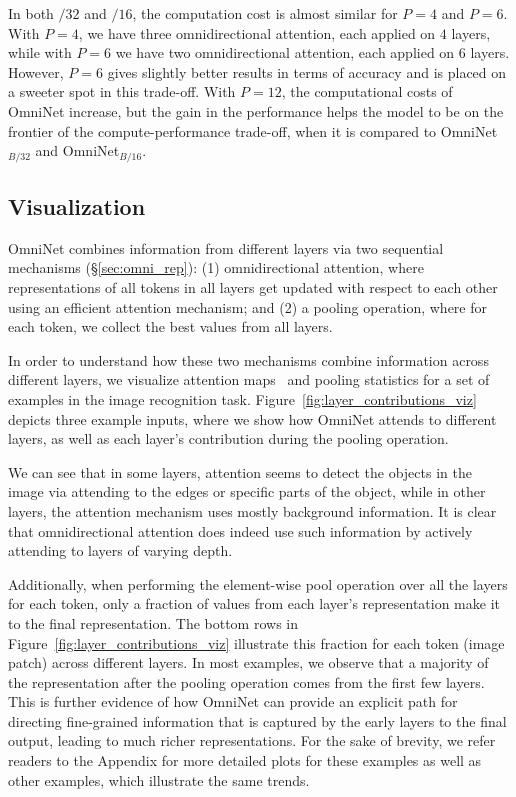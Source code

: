 \documentclass{article}
\begin{document}
In both $/32$ and $/16$, the computation cost is almost similar for $P=4$ and $P=6$. With $P=4$, we have three omnidirectional attention, each applied on $4$ layers, while with $P=6$ we have two omnidirectional attention, each applied on $6$ layers. However, $P=6$ gives slightly better results in terms of accuracy and is placed on a sweeter spot in this trade-off. 
With $P=12$, the computational costs of OmniNet increase, but the gain in the performance helps the model to be on the frontier of the compute-performance trade-off, when it is compared to  OmniNet$_{B/32}$ and OmniNet$_{B/16}$.

\subsection{Visualization}


OmniNet combines information from different layers via two sequential mechanisms (\S\ref{sec:omni_rep}): (1) omnidirectional attention, where representations of all tokens in all layers get updated with respect to each other using an efficient attention mechanism; and (2) a pooling operation, where for each token, we collect the best values from all layers. 

In order to understand how these two mechanisms combine information across different layers, we visualize attention maps~\citep{abnar-zuidema-2020-quantifying} and pooling statistics for a set of examples in the image recognition task. 
Figure~\ref{fig:layer_contributions_viz} depicts three example inputs, where we show how OmniNet attends to different layers, as well as each layer's contribution during the pooling operation.

We can see that in some layers, attention seems to detect the objects in the image via attending to the edges or specific parts of the object, while in other layers, the attention mechanism uses mostly background information. It is clear that omnidirectional attention does indeed use such information by actively attending to layers of varying depth.

Additionally, when performing the element-wise pool operation over all the layers for each token, only a fraction of values from each layer's representation make it to the final representation. The bottom rows in Figure~\ref{fig:layer_contributions_viz} illustrate this fraction for each token (image patch) across different layers. In most examples, we observe that a majority of the representation after the pooling operation comes from the first few layers. This is further evidence of how OmniNet can provide an explicit path for directing fine-grained information that is captured by the early layers to the final output, leading to much richer representations.
For the sake of brevity, we refer readers to the Appendix for more detailed plots for these examples as well as other examples, which illustrate the same trends.
\vspace{-6pt}
\end{document}
